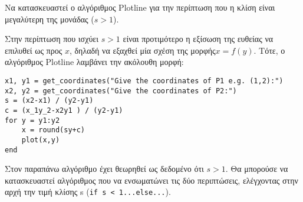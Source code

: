 \begin{exercise}

Να κατασκευαστεί ο αλγόριθμος Plotline για την περίπτωση που η κλίση είναι μεγαλύτερη της μονάδας ($s>1$).
\end{exercise}

\begin{solution}
	
Στην περίπτωση που ισχύει $s >1$ είναι προτιμότερο η εξίσωση της ευθείας να επιλυθεί ως προς $x$, δηλαδή να εξαχθεί μία σχέση της μορφής$ x = f (y)$. Τότε, ο αλγόριθμος Plotline λαμβάνει την ακόλουθη μορφή:
	
	
\begin{lstlisting} 
x1, y1 = get_coordinates("Give the coordinates of P1 e.g. (1,2):")
x2, y2 = get_coordinates("Give the coordinates of P2:")
s = (x2-x1) / (y2-y1)
c = (x_1y_2-x2y1 ) / (y2-y1)
for y = y1:y2
	x = round(sy+c) 
	plot(x,y)
end
\end{lstlisting}

Στον παραπάνω αλγόριθμο έχει θεωρηθεί ως δεδομένο ότι $s > 1$. Θα μπορούσε να κατασκευαστεί αλγόριθμος που να ενσωματώνει τις δύο περιπτώσεις, ελέγχοντας στην αρχή την τιμή κλίσης s (\texttt{if s < 1...else...}).


\end{solution}